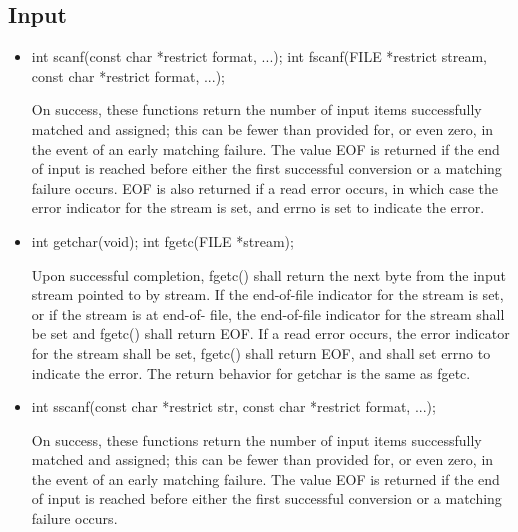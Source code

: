 \documentclass{report}
\begin{document}
    \subsection{Input}
    \begin{itemize}
        \item \bigbreak \noindent 
            \begin{cppcode}
                int scanf(const char *restrict format, ...);
                int fscanf(FILE *restrict stream, const char *restrict format, ...);
            \end{cppcode}
            \bigbreak \noindent 
            On success, these functions return the number of input items successfully matched and assigned; this can be fewer than provided for, or even zero, in the event of an early matching failure.
            \bigbreak \noindent 
            The value EOF is returned if the end of input is reached before either the first successful conversion or a matching failure occurs.  EOF is also returned if a read error occurs, in which case the error indicator for the stream is set, and errno is set to indicate the error.
        \item \bigbreak \noindent 
            \begin{cppcode}
                int getchar(void);
                int fgetc(FILE *stream);
            \end{cppcode}
            \bigbreak \noindent 
            Upon successful completion, fgetc() shall return the next byte from the input stream pointed to by stream.  If the end-of-file indicator for the stream is set, or if the stream is at end-of- file, the end-of-file indicator for the stream shall be set and fgetc() shall return EOF. If a read error occurs, the error indicator for the stream shall be set, fgetc() shall return EOF, and shall set errno to indicate the error.
            \bigbreak \noindent 
            The return behavior for getchar is the same as fgetc.
        \item \bigbreak \noindent 
            \begin{cppcode}
             int sscanf(const char *restrict str, const char *restrict format, ...);
             \end{cppcode}
             \bigbreak \noindent 
             On success, these functions return the number of input items successfully matched and assigned; this can be fewer than provided for, or even zero, in the event of an early matching failure.
             \bigbreak \noindent 
             The value EOF is returned if the end of input is reached before either the first successful conversion or a matching failure occurs.

\end{itemize}
\end{document}
